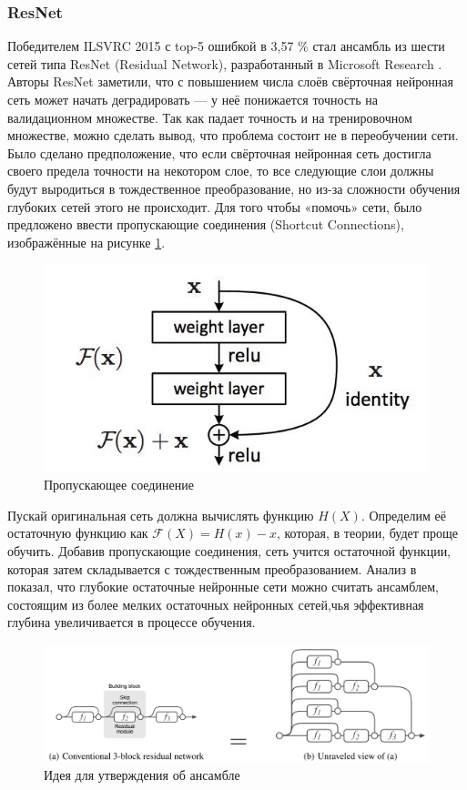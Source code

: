 \subsubsection*{ResNet}
Победителем ILSVRC 2015 с top-5 ошибкой в 3,57 \% стал ансамбль из шести
сетей типа ResNet (Residual Network), разработанный в Microsoft Research .
Авторы ResNet заметили, что с повышением числа слоёв свёрточная
нейронная сеть может начать деградировать — у неё понижается точность на
валидационном множестве. Так как падает точность и на тренировочном множестве,
можно сделать вывод, что проблема состоит не в переобучении сети.
Было сделано предположение, что если свёрточная нейронная сеть достигла своего
предела точности на некотором слое, то все следующие слои должны будут выродиться в
тождественное преобразование, но из-за сложности обучения глубоких сетей этого не
происходит. Для того чтобы «помочь» сети, было предложено ввести пропускающие
соединения (Shortcut Connections), изображённые на рисунке \ref{fig:resnet}.

\begin{figure}
	\centering
	\includegraphics[width=0.7\linewidth]{img/resnet}
	\caption{Пропускающее соединение}
	\label{fig:resnet}
\end{figure}

Пускай оригинальная сеть должна вычислять функцию
$ H(X) $. Определим её остаточную функцию как $ \mathcal{F}(X) = H(x) − x $,
которая, в теории, будет проще обучить. Добавив пропускающие
соединения, сеть учится остаточной функции, которая затем
складывается с тождественным преобразованием. Анализ\cite{veit2016residual} в показал, что глубокие остаточные нейронные сети можно считать ансамблем, состоящим из
более мелких остаточных нейронных сетей,чья эффективная глубина увеличивается в
процессе обучения.

\begin{figure}[h]
	\centering
	\includegraphics[width=0.9\linewidth]{img/resnet2}
	\caption{Идея для утверждения об ансамбле}
	\label{fig:resnet2}
\end{figure}

